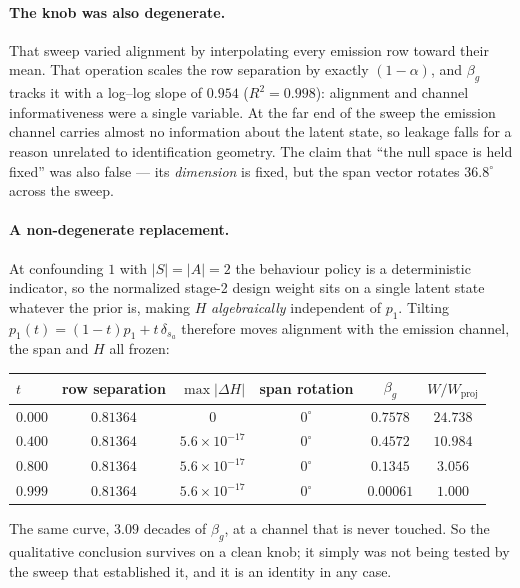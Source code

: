 \paragraph{The knob was also degenerate.} That sweep varied alignment by
interpolating every emission row toward their mean. That operation scales the row
separation by exactly $(1-\alpha)$, and $\beta_g$ tracks it with a log--log slope
of $0.954$ ($R^2 = 0.998$): alignment and channel informativeness were a single
variable. At the far end of the sweep the emission channel carries almost no
information about the latent state, so leakage falls for a reason unrelated to
identification geometry. The claim that ``the null space is held fixed'' was also
false --- its \emph{dimension} is fixed, but the span vector rotates $36.8^\circ$
across the sweep.

\paragraph{A non-degenerate replacement.} At confounding $1$ with $|S|=|A|=2$ the
behaviour policy is a deterministic indicator, so the normalized stage-2 design
weight sits on a single latent state whatever the prior is, making $H$
\emph{algebraically} independent of $p_1$. Tilting
$p_1(t) = (1-t)p_1 + t\,\delta_{s_a}$ therefore moves alignment with the emission
channel, the span and $H$ all frozen:

\begin{center}\small
\begin{tabular}{@{}lccccc@{}}
\toprule
$t$ & row separation & $\max|\Delta H|$ & span rotation & $\beta_g$ & $W/W_{\mathrm{proj}}$ \\
\midrule
$0.000$ & $0.81364$ & $0$ & $0^\circ$ & $0.7578$ & $24.738$ \\
$0.400$ & $0.81364$ & $5.6\times10^{-17}$ & $0^\circ$ & $0.4572$ & $10.984$ \\
$0.800$ & $0.81364$ & $5.6\times10^{-17}$ & $0^\circ$ & $0.1345$ & $3.056$ \\
$0.999$ & $0.81364$ & $5.6\times10^{-17}$ & $0^\circ$ & $0.00061$ & $1.000$ \\
\bottomrule
\end{tabular}
\end{center}

The same curve, $3.09$ decades of $\beta_g$, at a channel that is never touched.
So the qualitative conclusion survives on a clean knob; it simply was not being
tested by the sweep that established it, and it is an identity in any case.

